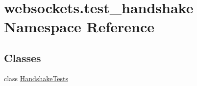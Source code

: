 \hypertarget{namespacewebsockets_1_1test__handshake}{}\section{websockets.\+test\+\_\+handshake Namespace Reference}
\label{namespacewebsockets_1_1test__handshake}
\subsection*{Classes}
\begin{DoxyCompactItemize}
\item 
class \hyperlink{classwebsockets_1_1test__handshake_1_1_handshake_tests}{Handshake\+Tests}
\end{DoxyCompactItemize}
